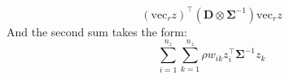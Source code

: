 \documentclass[openany, 11pt, oneside]{book}
\begin{document}
\begin{subappendices}
$$%
(\mathrm{vec}_rz) ^{\top} (\boldsymbol{D} \otimes \boldsymbol{\Sigma}^{-1}) \mathrm{vec}_r z
$$
And the second sum takes the form:
$$
 \sum_{i=1}^{n_z} \sum_{k=1}^{n_z} \rho w_{ik} z^{\top}_i \boldsymbol{\Sigma}^{-1} z_k %
$$
\end{subappendices}
\end{document}
